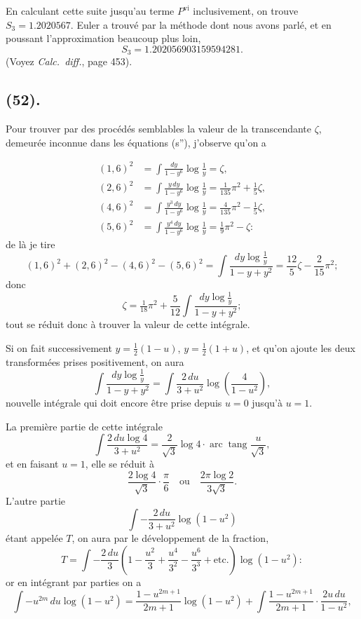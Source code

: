 \documentclass{article}
\begin{document}
En calculant cette suite jusqu'au terme $P^{\text{vi}}$ inclusivement, on trouve $S_{3}=1.2020567$. Euler a trouvé par la méthode dont nous avons parlé, et en poussant l'approximation beaucoup plus loin,
\[ S_{3}=1.202056903159594281. \]
(Voyez \emph{Calc.\ diff.}, page 453).

\subsection*{(52).}

Pour trouver par des procédés semblables la valeur de la transcendante $\zeta$, demeurée inconnue dans les équations (s''), j'observe qu'on a

\[ \begin{aligned} (1,6)^{2}&=\int\frac{dy}{1-y^{6}}\log\frac{1}{y}=\zeta,\\ (2,6)^{2}&=\int\frac{y\,dy}{1-y^{6}}\log\frac{1}{y}=\tfrac{1}{135}\pi^{2}+\tfrac{1}{5}\zeta,\\ (4,6)^{2}&=\int\frac{y^{3}\,dy}{1-y^{6}}\log\frac{1}{y}=\tfrac{4}{135}\pi^{2}-\tfrac{1}{5}\zeta,\\ (5,6)^{2}&=\int\frac{y^{4}\,dy}{1-y^{6}}\log\frac{1}{y}=\tfrac{1}{9}\pi^{2}-\zeta: \end{aligned} \]
de là je tire
\[ (1,6)^{2}+(2,6)^{2}-(4,6)^{2}-(5,6)^{2}=\int\frac{dy\log\frac{1}{y}}{1-y+y^{2}}=\frac{12}{5}\zeta-\frac{2}{15}\pi^{2}; \]
donc
\[ \zeta=\tfrac{1}{18}\pi^{2}+\frac{5}{12}\int\frac{dy\log\frac{1}{y}}{1-y+y^{2}}; \]
tout se réduit donc à trouver la valeur de cette intégrale.

Si on fait successivement $y=\frac{1}{2}(1-u)$, $y=\frac{1}{2}(1+u)$, et qu'on ajoute les deux transformées prises positivement, on aura
\[ \int\frac{dy\log\frac{1}{y}}{1-y+y^{2}}=\int\frac{2\,du}{3+u^{2}}\log\left(\frac{4}{1-u^{2}}\right), \]
nouvelle intégrale qui doit encore être prise depuis $u=0$ jusqu'à $u=1$.

La première partie de cette intégrale
\[ \int\frac{2\,du\log 4}{3+u^{2}}=\frac{2}{\sqrt{3}}\log 4\cdot\operatorname{arc}\operatorname{tang}\frac{u}{\sqrt{3}}, \]
et en faisant $u=1$, elle se réduit à
\[ \frac{2\log 4}{\sqrt{3}}\cdot\frac{\pi}{6}\quad\text{ou}\quad\frac{2\pi\log 2}{3\sqrt{3}}. \]
L'autre partie
\[ \int-\frac{2\,du}{3+u^{2}}\log(1-u^{2}) \]
étant appelée $T$, on aura par le développement de la fraction,
\[ T=\int-\frac{2\,du}{3}\left(1-\frac{u^{2}}{3}+\frac{u^{4}}{3^{2}}-\frac{u^{6}}{3^{3}}+\text{etc.}\right)\log(1-u^{2}): \]
or en intégrant par parties on a
\[ \int-u^{2m}\,du\log(1-u^{2})=\frac{1-u^{2m+1}}{2m+1}\log(1-u^{2})+\int\frac{1-u^{2m+1}}{2m+1}\cdot\frac{2u\,du}{1-u^{2}}, \]
\end{document}
